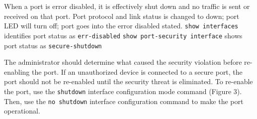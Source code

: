 \documentclass[../EngineeringJournal_CDavis.tex]{subfiles}
\begin{document}


\hspace{0.2cm}
\begin{tcolorbox}[width=6.3in]
\scriptsize 
  \begin{outline}
    \1 When a port is error disabled, it is effectively shut down and no traffic is sent or received on that port.
    \1 Port protocol and link status is changed to down; port LED will turn off; port goes into the error disabled stated.
    \1 {\verb$show interfaces$} identifies port status as {\verb$err-disabled$}
    \1 {\verb$show port-security interface$} shows port status as {\verb$secure-shutdown$}
  \end{outline}
The administrator should determine what caused the security violation before
re-enabling the port. If an unauthorized device is connected to a secure port,
the port should not be re-enabled until the security threat is eliminated. To
re-enable the port, use the {\verb$shutdown$} interface configuration mode
  command (Figure 3). Then, use the {\verb$no shutdown$} interface configuration command to make the port operational.
\end{tcolorbox}
\hspace{0.2cm}
\normalsize  
\end{document}

